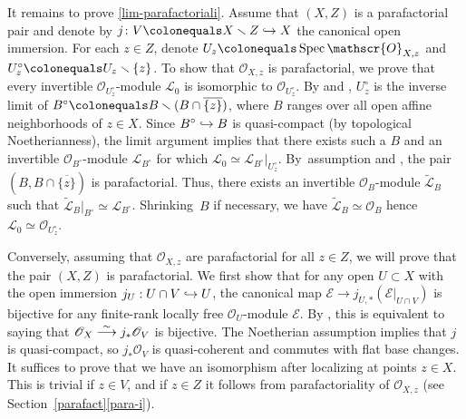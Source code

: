 \documentclass[JEP,XML,SOM,Unicode,published]{cedram}
\newcommand\hto{\mathrel{\lhook\joinrel\to}}
\newcommand\To[1]{\mathchoice{\xrightarrow{\textstyle\kern4pt#1\kern3pt}}{\stackrel{#1}{\longrightarrow}}{}{}}
\let\backslash\smallsetminus
\newcommand{\sE}{\mathscr{E}}
\newcommand{\sL}{\mathscr{L}}
\newcommand{\sO}{\mathscr{O}}
\let\hra\hto
\let\wt\widetilde
\let\ov\overline
\let\ce\colonequals
\DeclareMathOperator{\Spec}{Spec}
\providecommand{\SP}[1]{\cite[\href{https://stacks.math.columbia.edu/tag/#1}{#1}]{SP}}
\theoremstyle{plain}
\theoremstyle{definition}
\begin{document}
It remains to prove \eqref{lim-parafactoriali}.
Assume that $(X,Z)$ is a parafactorial pair and denote by $j\colon V\ce X\backslash Z\hra X$ the canonical open immersion. For each $z\in Z$, denote $U_z\ce \Spec \sO_{X,z}$ and $U_z^{\circ}\ce U_z\backslash \{z\}$.
To show that $\sO_{X,z}$ is parafactorial, we prove that every invertible $\sO_{U_z^{\circ}}$\nobreakdash-mod\-ule $\sL_{0}$ is isomorphic to $\sO_{U_z^{\circ}}$.
By \cite[Prop.\,8.2.13]{EGAIV3} and \cite[Prop.\,2.4.2]{EGAI}, $U_z^{\circ}$ is the inverse limit of $B^{\circ}\ce B\backslash (B\cap \ov{\{z\}})$, where $B$ ranges over all open affine neighborhoods of $z\in X$.
Since $B^{\circ}\hto B$ is quasi-compact (by topological Noetherianness), the limit argument \SP{0B8W} implies that there exists such a $B$ and an invertible $\sO_{B^{\circ}}$\nobreakdash-mod\-ule $\sL_{B^{\circ}}$ for which $\sL_0\simeq \sL_{B^{\circ}}|_{U_z^{\circ}}$.
By~assumption and \cite[Cor.\,21.13.6(i)(ii)]{EGAIV4}, the pair $(B,B\cap \ov{\{z\}})$ is parafactorial.
Thus, there exists an invertible $\sO_B$\nobreakdash-mod\-ule $\wt{\sL}_B$ such that $\wt{\sL}_B|_{B^{\circ}}\simeq \sL_{B^{\circ}}$. Shrinking~$B$ if necessary, we have $\wt{\sL}_B\simeq \sO_B$ hence $\sL_0\simeq \sO_{U_z^{\circ}}$.

Conversely, assuming that $\sO_{X,z}$ are parafactorial for all $z\in Z$, we will prove that the pair $(X,Z)$ is parafactorial.
We first show that for any open $U\subset X$ with the open immersion $j_U:U\cap V\hra U$, the canonical map $\sE\to j_{U,*}(\sE|_{U\cap V})$ is bijective for any finite-rank locally free $\sO_U$\nobreakdash-mod\-ule $\sE$. By \cite[Cor.\,21.13.3(b)]{EGAIV4}, this is equivalent to saying that $\sO_{X}\To{\sim}j_*\sO_{V}$ is bijective.
The Noetherian assumption implies that $j$
is quasi-compact, so $j_*\sO_V$ is quasi-coherent and commutes with flat base changes. It suffices to prove that we have an isomorphism after localizing at points
$z\in X$. This is trivial if $z\in V$, and if
$z\in Z$ it follows from parafactoriality of $\sO_{X,z}$ (see Section~\ref{parafact}\eqref{para-i}).
\end{document}

